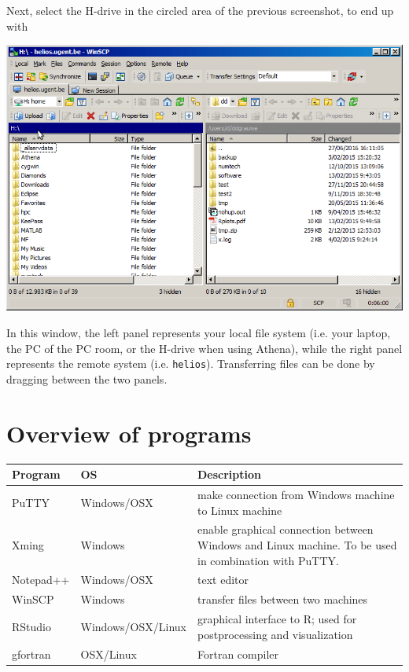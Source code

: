 \documentclass[a4paper]{article}
\begin{document}
%
Next, select the H-drive in the circled area of the previous screenshot, to end up with
%
\begin{center}
	\includegraphics[scale=.5]{winscp3.png}
\end{center}
%
\par
In this window, the left panel represents your local file system (i.e. your laptop, the PC of the PC room, or the H-drive when using Athena), while the right panel represents the remote system (i.e. \texttt{helios}). Transferring files can be done by dragging between the two panels.
%
\section{Overview of programs}
%
\begin{center}
	\def\arraystretch{1.3}
	\begin{tabular}{llp{}}
		Program	&	OS	&	Description	\\
	\hline
		PuTTY			&	Windows/OSX	&	make connection from Windows machine to Linux machine	\\
		Xming			&	Windows	&	enable graphical connection between Windows and Linux machine. To be used in combination with PuTTY.\\
		Notepad++	&	Windows/OSX	&	text editor	\\
		WinSCP		&	Windows		&	transfer files between two machines	\\
		RStudio		&	Windows/OSX/Linux	&	graphical interface to R; used for postprocessing and visualization	\\
		gfortran	&	OSX/Linux	&	Fortran compiler
	\end{tabular}
\end{center}
%
\end{document}
